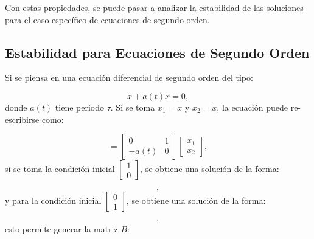 \documentclass[a4paper,10pt]{report}
\begin{document}
Con estas propiedades, se puede pasar a analizar la estabilidad de las soluciones para el caso específico de ecuaciones de segundo orden.

\subsection{Estabilidad para Ecuaciones de Segundo Orden}

Si se piensa en una ecuación diferencial de segundo orden del tipo:

\begin{equation}
\ddot{x} + a(t)x= 0,
\end{equation} donde $a(t)$ tiene periodo $\tau$. Si se toma $x_1 = x$ y $x_2 = \dot{x}$, la ecuación puede re-escribirse como:

\begin{equation}
[\begin{array}{c}
\dot{x_1} \\
\dot{x_2}
\end{array}] = [\begin{array}{cc}
0 & 1 \\
-a(t) & 0
\end{array}][\begin{array}{c} 
x_1 \\ 
x_2

\end{array}],
\end{equation} si se toma la condición inicial $[\begin{array}{c} 1 \\ 0 \end{array}]$, se obtiene una solución de la forma:

\begin{equation}
[\begin{array}{c}
x_1^1(t) \\
\dot{x_1^1(t)}
\end{array}],
\end{equation} y para la condición inicial $[\begin{array}{c} 0 \\ 1 \end{array}]$, se obtiene una solución de la forma:

\begin{equation}
[\begin{array}{c}
x_1^2(t) \\
\dot{x_1^2(t)}
\end{array}],
\end{equation} esto permite generar la matriz $B$:
\end{document}

